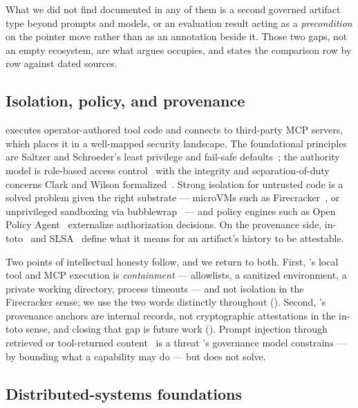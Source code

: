 What we did not find documented in any of them is a second governed artifact type
beyond prompts and models, or an evaluation result acting as a \emph{precondition}
on the pointer move rather than as an annotation beside it. Those two gaps, not an
empty ecosystem, are what  argues \sys occupies, and
 states the comparison row by row against dated sources.

\subsection{Isolation, policy, and provenance}

\sys executes operator-authored tool code and connects to third-party MCP servers,
which places it in a well-mapped security landscape. The foundational principles
are Saltzer and Schroeder's least privilege and fail-safe
defaults~\cite{saltzer1975protection}; the authority model is role-based access
control~\cite{sandhu1996rbac} with the integrity and separation-of-duty concerns
Clark and Wilson formalized~\cite{clark1987integrity}. Strong isolation for
untrusted code is a solved problem given the right substrate --- microVMs such as
Firecracker~\cite{agache2020firecracker}, or unprivileged sandboxing via
bubblewrap~\cite{bubblewrap} --- and policy engines such as Open Policy
Agent~\cite{opa} externalize authorization decisions. On the provenance side,
in-toto~\cite{torresarias2019intoto} and SLSA~\cite{slsa} define what it means for
an artifact's history to be attestable.

Two points of intellectual honesty follow, and we return to both. First, \sys's
local tool and MCP execution is \emph{containment} --- allowlists, a sanitized
environment, a private working directory, process timeouts --- and not isolation
in the Firecracker sense; we use the two words distinctly throughout
(). Second, \sys's provenance anchors are internal records, not
cryptographic attestations in the in-toto sense, and closing that gap is future
work (). Prompt injection through retrieved or tool-returned
content~\cite{greshake2023injection,perez2022ignore} is a threat \sys's governance
model constrains --- by bounding what a capability may do --- but does not solve.

\subsection{Distributed-systems foundations}

